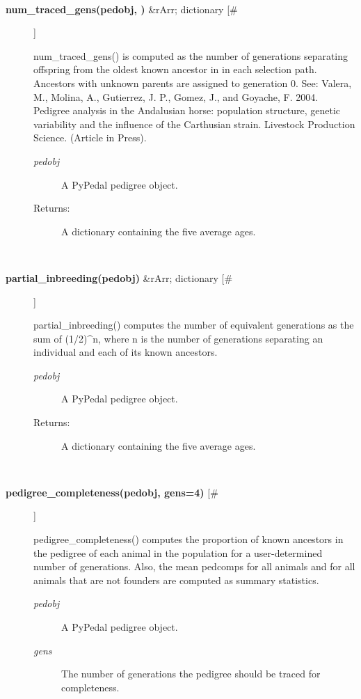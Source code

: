 \begin{description}
\begin{description}
\end{description}
\\ 

\item[\textbf{num\_traced\_gens(pedobj, )}
 \&rArr; dictionary [\#]]

 num\_traced\_gens() is computed as the number of generations separating offspring from the oldest known ancestor in in each selection path. Ancestors with unknown parents are assigned to generation 0. See: Valera, M., Molina, A., Gutierrez, J. P., Gomez, J., and Goyache, F. 2004. Pedigree analysis in the Andalusian horse: population structure, genetic variability and the influence of the Carthusian strain. Livestock Production Science. (Article in Press).
\begin{description}
\item[\emph{pedobj}
] A PyPedal pedigree object.
\item[Returns:] A dictionary containing the five average ages.

\end{description}
\\ 

\item[\textbf{partial\_inbreeding(pedobj)}
 \&rArr; dictionary [\#]]

 partial\_inbreeding() computes the number of equivalent generations as the sum of (1/2)\^{}n, where n is the number of generations separating an individual and each of its known ancestors.
\begin{description}
\item[\emph{pedobj}
] A PyPedal pedigree object.
\item[Returns:] A dictionary containing the five average ages.

\end{description}
\\ 

\item[\textbf{pedigree\_completeness(pedobj, gens=4)}
 [\#]]

 pedigree\_completeness() computes the proportion of known ancestors in the pedigree of each animal in the population for a user-determined number of generations. Also, the mean pedcomps for all animals and for all animals that are not founders are computed as summary statistics.
\begin{description}
\item[\emph{pedobj}
] A PyPedal pedigree object.
\item[\emph{gens}
] The number of generations the pedigree should be traced for completeness.


\end{description}
\end{description}
